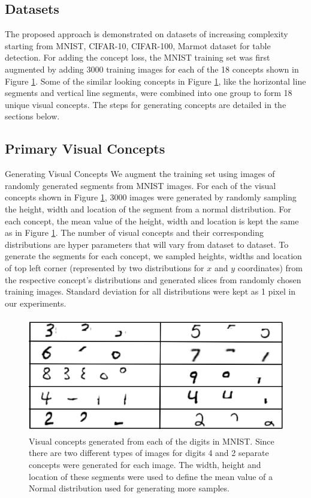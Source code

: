 \documentclass{JMLFS}
\begin{document}
\subsection{Datasets}
The proposed approach is demonstrated on datasets of increasing complexity starting from MNIST, CIFAR-10, CIFAR-100, Marmot \cite{fang2012} dataset for table detection.
For adding the concept loss, the MNIST training set was first augmented by adding 3000 training images for each of the 18 concepts shown in Figure \ref{f:visual_concept}.
Some of the similar looking concepts in Figure \ref{f:visual_concept}, like the horizontal line segments and vertical line segments, were combined into one group to form 18 unique  visual concepts.
The steps for generating concepts are detailed in the sections below.

\subsection{Primary Visual Concepts}
Generating Visual Concepts
We augment the training set using images of randomly generated segments from MNIST images.
For each of the visual concepts shown in Figure \ref{f:visual_concept}, 3000 images were generated by randomly sampling the height, width and location of the segment from a normal distribution.
For each concept, the mean value of the height, width and location is kept the same as in Figure \ref{f:visual_concept}.
The number of visual concepts and their corresponding distributions are hyper parameters that will vary from dataset to dataset.
To generate the segments for each concept, we sampled heights, widths and location of top left corner (represented by two distributions for  $x$ and $y$ coordinates) from the respective concept's distributions and generated slices from randomly chosen training images.
Standard deviation for all distributions were kept as 1 pixel in our experiments.

\begin{figure}
\centering
\includegraphics[height=2in]{images/visual_concepts.png}
\caption{Visual concepts generated from each of the digits in MNIST. Since there are two different types of images for digits 4 and 2 separate concepts were generated for each image. The width, height and location of these segments were used to define the mean value of a Normal distribution used for generating more samples.}
\label{f:visual_concept}
\end{figure}
\end{document}
